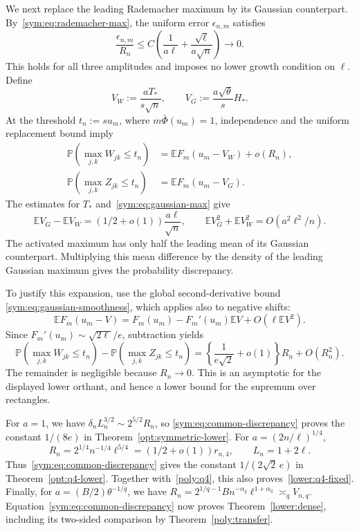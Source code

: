 \documentclass[11pt,letterpaper]{article}
\theoremstyle{remark}
\newcommand{\E}{\mathbb E}
\newcommand{\Pp}{\mathbb P}
\begin{document}
We next replace the leading Rademacher maximum by its Gaussian
counterpart. By~\eqref{sym:eq:rademacher-max}, the uniform error
\(\epsilon_{n,m}\) satisfies
\[
 \frac{\epsilon_{n,m}}{R_n}
 \le C\left(\frac1{a\ell}
                  +\frac{\sqrt\ell}{a\sqrt n}\right)\longrightarrow0.
\]
This holds for all three amplitudes and imposes no lower growth condition
on \(\ell\). Define
\[
 V_W:=\frac{aT_*}{s\sqrt n},\qquad
 V_G:=\frac{a\sqrt\theta}{s}H_*.
\]
At the threshold \(t_n:=s u_m\), where
\(m\bar\Phi(u_m)=1\), 
independence and the uniform replacement bound imply
\begin{align*}
 \Pp(\max_{j,k}W_{jk}\le t_n)&=\E F_m(u_m-V_W)+o(R_n),\\
 \Pp(\max_{j,k}Z_{jk}\le t_n)&=\E F_m(u_m-V_G).
\end{align*}
The estimates for \(T_*\) and~\eqref{sym:eq:gaussian-max} give
\[
 \E V_G-\E V_W=(1/2+o(1))\frac{a\ell}{\sqrt n},\qquad
 \E V_G^2+\E V_W^2=O(a^2\ell^2/n).
\]
The activated maximum has only half the leading mean of its Gaussian
counterpart. Multiplying this mean difference by the density of the
leading Gaussian maximum gives the probability discrepancy.

To justify this expansion, use the global second-derivative bound
\eqref{sym:eq:gaussian-smoothness}, which applies also to negative
shifts:
\[
 \E F_m(u_m-V)=F_m(u_m)-F_m'(u_m)\E V+O(\ell\E V^2).
\]
Since \(F_m'(u_m)\sim\sqrt{2\ell}/e\), subtraction yields
\begin{equation}
 \Pp(\max_{j,k}W_{jk}\le t_n)
 -\Pp(\max_{j,k}Z_{jk}\le t_n)
 =\left\{\frac1{e\sqrt2}+o(1)\right\}R_n+O(R_n^2).
 \label{sym:eq:common-discrepancy}
\end{equation}
The remainder is negligible because \(R_n\to0\). This is an
asymptotic for the displayed lower orthant, and hence a lower bound
for the supremum over rectangles.

For \(a=1\), we have
\(\delta_nL_n^{3/2}\sim2^{5/2}R_n\), so
\eqref{sym:eq:common-discrepancy} proves the constant \(1/(8e)\)
in Theorem~\ref{opt:symmetric-lower}.
For \(a=(2n/\ell)^{1/4}\),
\[
 R_n=2^{1/4}n^{-1/4}\ell^{5/4}
       =(1/2+o(1))r_{n,4},\qquad L_n=1+2\ell.
\]
Thus~\eqref{sym:eq:common-discrepancy} gives the constant
\(1/(2\sqrt2\,e)\) in Theorem~\ref{opt:q4-lower}.
Together with~\eqref{poly:q4}, this also proves~\eqref{lower:q4-fixed}.
Finally, for \(a=(B/2)\theta^{-1/q}\), we have
\(R_n=2^{1/q-1}Bn^{-\alpha_q}\ell^{1+\alpha_q}\asymp_q V_{n,q}\).
Equation~\eqref{sym:eq:common-discrepancy} now proves
Theorem~\ref{lower:dense}, including its two-sided comparison by
Theorem~\ref{poly:transfer}.
\end{document}
